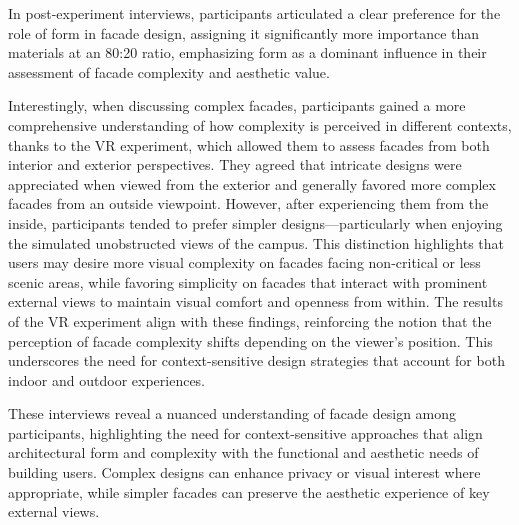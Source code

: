 In post-experiment interviews, participants articulated a clear preference for the role of form in facade design, assigning it significantly more importance than materials at an 80:20 ratio, emphasizing form as a dominant influence in their assessment of facade complexity and aesthetic value.

Interestingly, when discussing complex facades, participants gained a more comprehensive understanding of how complexity is perceived in different contexts, thanks to the VR experiment, which allowed them to assess facades from both interior and exterior perspectives.
They agreed that intricate designs were appreciated when viewed from the exterior and generally favored more complex facades from an outside viewpoint.
However, after experiencing them from the inside, participants tended to prefer simpler designs—particularly when enjoying the simulated unobstructed views of the campus.
This distinction highlights that users may desire more visual complexity on facades facing non-critical or less scenic areas, while favoring simplicity on facades that interact with prominent external views to maintain visual comfort and openness from within.
The results of the VR experiment align with these findings, reinforcing the notion that the perception of facade complexity shifts depending on the viewer's position.
This underscores the need for context-sensitive design strategies that account for both indoor and outdoor experiences.

These interviews reveal a nuanced understanding of facade design among participants, highlighting the need for context-sensitive approaches that align architectural form and complexity with the functional and aesthetic needs of building users.
Complex designs can enhance privacy or visual interest where appropriate, while simpler facades can preserve the aesthetic experience of key external views.








